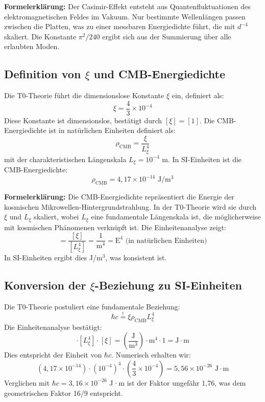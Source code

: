 \documentclass[12pt,a4paper]{article}
\theoremstyle{definition}
\theoremstyle{remark}
\begin{document}
	\textbf{Formelerkl\"arung:} Der Casimir-Effekt entsteht aus Quantenfluktuationen des elektromagnetischen Feldes im Vakuum. Nur bestimmte Wellenl\"angen passen zwischen die Platten, was zu einer messbaren Energiedichte f\"uhrt, die mit $d^{-4}$ skaliert. Die Konstante $\pi^2/240$ ergibt sich aus der Summierung \"uber alle erlaubten Moden.
	
	\subsection{Definition von $\xi$ und CMB-Energiedichte}
	Die T0-Theorie f\"uhrt die dimensionslose Konstante $\xi$ ein, definiert als:
	\begin{equation}
		\xi = \frac{4}{3} \times 10^{-4}
	\end{equation}
	Diese Konstante ist dimensionslos, best\"atigt durch $[\xi] = [1]$. Die CMB-Energiedichte ist in nat\"urlichen Einheiten definiert als:
	\begin{equation}
		\rho_{\text{CMB}} = \frac{\xi}{L_\xi^4}
	\end{equation}
	mit der charakteristischen L\"angenskala $L_\xi = 10^{-4}$ m. In SI-Einheiten ist die CMB-Energiedichte:
	\begin{equation}
		\rho_{\text{CMB}} = 4,17 \times 10^{-14} \text{ J}/\text{m}^3
	\end{equation}
	
	\textbf{Formelerkl\"arung:} Die CMB-Energiedichte repr\"asentiert die Energie der kosmischen Mikrowellen-Hintergrundstrahlung. In der T0-Theorie wird sie durch $\xi$ und $L_\xi$ skaliert, wobei $L_\xi$ eine fundamentale L\"angenskala ist, die m\"oglicherweise mit kosmischen Ph\"anomenen verkn\"upft ist. Die Einheitenanalyse zeigt:
	\begin{equation}
		[\rho_{\text{CMB}}] = \frac{[\xi]}{[L_\xi^4]} = \frac{1}{\text{m}^4} = \text{E}^4 \text{ (in nat\"urlichen Einheiten)}
	\end{equation}
	In SI-Einheiten ergibt dies J/m$^3$, was konsistent ist.
	
	\subsection{Konversion der $\xi$-Beziehung zu SI-Einheiten}
	Die T0-Theorie postuliert eine fundamentale Beziehung:
	\begin{equation}
		\hbar c \stackrel{!}{=} \xi \rho_{\text{CMB}} L_\xi^4
	\end{equation}
	Die Einheitenanalyse best\"atigt:
	\begin{equation}
		[\rho_{\text{CMB}}] \cdot [L_\xi^4] \cdot [\xi] = \left( \frac{\text{J}}{\text{m}^3} \right) \cdot \text{m}^4 \cdot 1 = \text{J} \cdot \text{m}
	\end{equation}
	Dies entspricht der Einheit von $\hbar c$. Numerisch erhalten wir:
	\begin{equation}
		\left( 4,17 \times 10^{-14} \right) \cdot \left( 10^{-4} \right)^4 \cdot \left( \frac{4}{3} \times 10^{-4} \right) = 5,56 \times 10^{-26} \text{ J} \cdot \text{m}
	\end{equation}
	Verglichen mit $\hbar c = 3,16 \times 10^{-26}$ J·m ist der Faktor ungef\"ahr 1,76, was dem geometrischen Faktor 16/9 entspricht.
	
\end{document}
